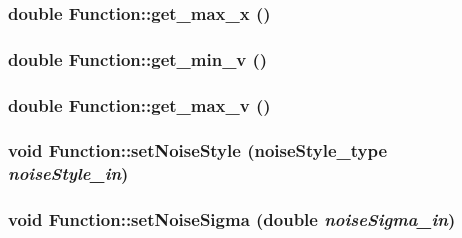 \hypertarget{classFunction_add009c15298f8cbbf62958f62e49b0e}{
\subsubsection{\setlength{\rightskip}{0pt plus 5cm}double Function::get\_\-max\_\-x ()}}
\label{classFunction_add009c15298f8cbbf62958f62e49b0e}


\hypertarget{classFunction_439c95846f893146177e7daee180e924}{
\subsubsection{\setlength{\rightskip}{0pt plus 5cm}double Function::get\_\-min\_\-v ()}}
\label{classFunction_439c95846f893146177e7daee180e924}


\hypertarget{classFunction_061e6bab528e29d88a41d0958ecbf8dd}{
\subsubsection{\setlength{\rightskip}{0pt plus 5cm}double Function::get\_\-max\_\-v ()}}
\label{classFunction_061e6bab528e29d88a41d0958ecbf8dd}


\hypertarget{classFunction_5abec82d0206fbcaacbbbe210ff5dfaa}{
\subsubsection{\setlength{\rightskip}{0pt plus 5cm}void Function::setNoiseStyle ({\bf noiseStyle\_\-type} {\em noiseStyle\_\-in})}}
\label{classFunction_5abec82d0206fbcaacbbbe210ff5dfaa}


\hypertarget{classFunction_d1077d6767ed99ff6d39adedd86de876}{
\subsubsection{\setlength{\rightskip}{0pt plus 5cm}void Function::setNoiseSigma (double {\em noiseSigma\_\-in})}}
\label{classFunction_d1077d6767ed99ff6d39adedd86de876}


